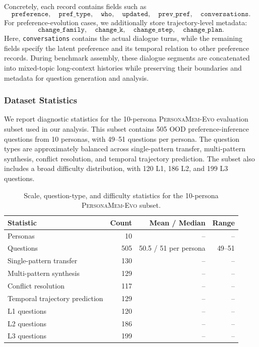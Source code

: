 \documentclass{article}
\begin{document}
Concretely, each record contains fields such as
\[
\texttt{preference},\quad
\texttt{pref\_type},\quad
\texttt{who},\quad
\texttt{updated},\quad
\texttt{prev\_pref},\quad
\texttt{conversations}.
\]
For preference-evolution cases, we additionally store trajectory-level metadata:
\[
\texttt{change\_family},\quad
\texttt{change\_k},\quad
\texttt{change\_step},\quad
\texttt{change\_plan}.
\]
Here, \texttt{conversations} contains the actual dialogue turns, while the remaining fields specify the latent preference and its temporal relation to other preference records. During benchmark assembly, these dialogue segments are concatenated into mixed-topic long-context histories while preserving their boundaries and metadata for question generation and analysis.



\subsubsection{Dataset Statistics}
\label{app:persona_dataset_statistics}

We report diagnostic statistics for the 10-persona \textsc{PersonaMem-Evo} evaluation subset used in our analysis. This subset contains 505 OOD preference-inference questions from 10 personas, with 49--51 questions per persona. The question types are approximately balanced across single-pattern transfer, multi-pattern synthesis, conflict resolution, and temporal trajectory prediction. The subset also includes a broad difficulty distribution, with 120 L1, 186 L2, and 199 L3 questions.

\begin{table}[!htbp]
\centering
\small
\begin{tabular}{lrrr}
\toprule
\textbf{Statistic} & \textbf{Count} & \textbf{Mean / Median} & \textbf{Range} \\
\midrule
Personas & 10 & -- & -- \\
Questions & 505 & 50.5 / 51 per persona & 49--51 \\
\midrule
Single-pattern transfer & 130 & -- & -- \\
Multi-pattern synthesis & 129 & -- & -- \\
Conflict resolution & 117 & -- & -- \\
Temporal trajectory prediction & 129 & -- & -- \\
\midrule
L1 questions & 120 & -- & -- \\
L2 questions & 186 & -- & -- \\
L3 questions & 199 & -- & -- \\
\bottomrule
\end{tabular}
\caption{Scale, question-type, and difficulty statistics for the 10-persona \textsc{PersonaMem-Evo} subset.}
\label{tab:personamem_evo_10p_scale}
\end{table}
\end{document}

